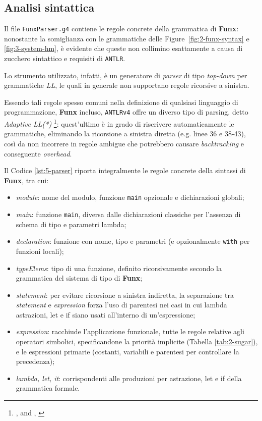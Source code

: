 \subsection{Analisi sintattica}
\label{sec:5-3-syntactic-analysis}

Il file \texttt{FunxParser.g4} contiene le regole concrete della grammatica di \textbf{Funx}:
nonostante la somiglianza con le grammatiche delle Figure~\ref{fig:2-funx-syntax} e \ref{fig:3-system-hm},
è evidente che queste non collimino esattamente a causa di zucchero sintattico e requisiti di \texttt{ANTLR}.

\noindent Lo strumento utilizzato, infatti, è un generatore di \textit{parser} di tipo \textit{top-down}
per grammatiche \textit{LL}, le quali in generale non supportano regole ricorsive a sinistra.

\noindent Essendo tali regole spesso comuni nella definizione di qualsiasi linguaggio di programmazione,
\textbf{Funx} incluso, \texttt{ANTLRv4} offre un diverso tipo di parsing, detto \textit{Adaptive LL(*)}%
\footnote{, \cite{Parr-2011-FoundationANTLR}
    and , \cite{Parr-2014-AdaptiveLL}}:
quest'ultimo è in grado di riscrivere automaticamente le grammatiche, eliminando la ricorsione a sinistra diretta (e.g. linee 36 e 38-43),
così da non incorrere in regole ambigue che potrebbero causare \textit{backtracking} e conseguente \textit{overhead}.

\noindent Il Codice \ref{lst:5-parser} riporta integralmente le regole concrete della sintassi di \textbf{Funx}, tra cui:
\begin{itemize}
    \item \textit{module}: nome del modulo, funzione \texttt{main} opzionale e dichiarazioni globali;
    \item \textit{main}: funzione \texttt{main}, diversa dalle dichiarazioni classiche per l'assenza di schema di tipo e parametri lambda;
    \item \textit{declaration}: funzione con nome, tipo e parametri (e opzionalmente \texttt{with} per funzioni locali);
    \item \textit{typeElems}: tipo di una funzione, definito ricorsivamente secondo la grammatica del sistema di tipo di \textbf{Funx};
    \item \textit{statement}: per evitare ricorsione a sinistra indiretta, la separazione tra \textit{statement} e \textit{expression}
          forza l'uso di parentesi nei casi in cui lambda astrazioni, let e if siano usati all'interno di un'espressione;
    \item \textit{expression}: racchiude l'applicazione funzionale, tutte le regole relative agli operatori simbolici,
          specificandone la priorità implicite (Tabella \ref{tab:2-sugar}), e le espressioni primarie
          (costanti, variabili e parentesi per controllare la precedenza);
    \item \textit{lambda, let, it}: corrispondenti alle produzioni per astrazione, let e if della grammatica formale.
\end{itemize}

